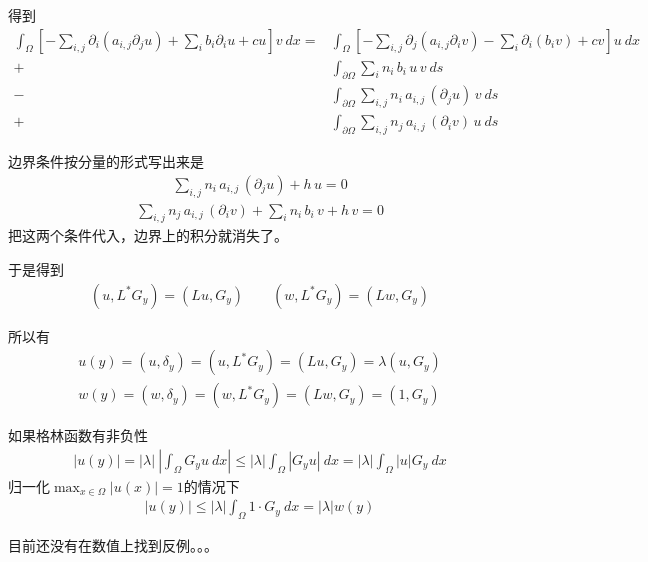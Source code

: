 \documentclass[12pt,a4paper]{article}
\begin{document}
得到
\begin{align*}
\int_\Omega [-\sum_{i,j} \partial_i (a_{i,j} \partial_j u) + \sum_{i} b_i \partial_i u + c u] v \ dx = & \int_\Omega [-\sum_{i,j} \partial_j (a_{i,j} \partial_i v) - \sum_{i} \partial_i (b_i v) + c v] u \ dx \\
+ & \int_{\partial \Omega} \sum_{i} n_i \, b_i \, u \, v \ ds \\
- & \int_{\partial \Omega} \sum_{i,j} n_i \, a_{i,j} \, (\partial_j u) \, v \ ds \\
+ & \int_{\partial \Omega} \sum_{i,j} n_j \, a_{i,j} \, (\partial_i v) \, u \ ds
\end{align*}

边界条件按分量的形式写出来是
\begin{align*}
\sum_{i,j} n_i \, a_{i,j} \, (\partial_j u) + h \, u = 0
\end{align*}
\begin{align*}
\sum_{i,j} n_j \, a_{i,j} \, (\partial_i v) + \sum_{i} n_i \, b_i \, v + h \, v = 0
\end{align*}
把这两个条件代入，边界上的积分就消失了。

于是得到
\begin{align*}
 (u, L^{*} G_y) = (L u, G_y) \qquad (w, L^{*} G_y) = (L w, G_y)
\end{align*}

所以有
\begin{align*}
u(y) = (u, \delta_y) = (u, L^{*} G_y) = (L u, G_y) = \lambda (u, G_y) \\
w(y) = (w, \delta_y) = (w, L^{*} G_y) = (L w, G_y) = (1, G_y)
\end{align*}

如果格林函数有非负性
\begin{align*}
|u(y)| = |\lambda| \ |\int_\Omega G_y u \ dx| \leq |\lambda| \int_\Omega |G_y u| \ dx = |\lambda| \int_\Omega |u| G_y \ dx
\end{align*}
归一化$\max_{x \in \Omega} |u(x)| = 1$的情况下
\begin{align*}
|u(y)| \leq |\lambda| \int_\Omega 1 \cdot G_y \ dx = |\lambda| w(y)
\end{align*}

目前还没有在数值上找到反例。。。
\end{document}
